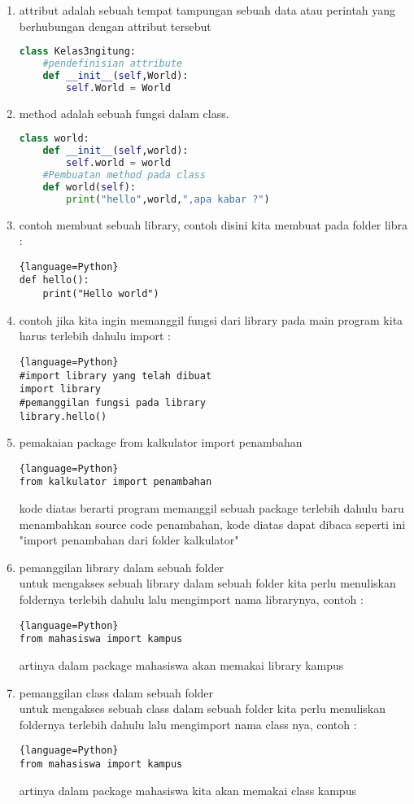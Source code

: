 \begin{enumerate}
			\item attribut adalah sebuah tempat tampungan sebuah data atau perintah yang berhubungan dengan attribut tersebut
			\begin{lstlisting}[language=Python]
class Kelas3ngitung:
	#pendefinisian attribute
    def __init__(self,World):
        self.World = World
			\end{lstlisting}
			
			\item method adalah sebuah fungsi dalam class.
			\begin{lstlisting}[language=Python]
class world:
    def __init__(self,world):
        self.world = world
    #Pembuatan method pada class
    def world(self):
       	print("hello",world,",apa kabar ?")
			\end{lstlisting}
			
			\item contoh membuat sebuah library, contoh disini kita membuat pada folder libra :
			\begin{lstlisting}{language=Python}
def hello():
    print("Hello world")
			\end{lstlisting}

            \newpage
			\item contoh jika kita ingin memanggil fungsi dari library pada main program kita harus terlebih dahulu import :
			\begin{lstlisting}{language=Python}
#import library yang telah dibuat
import library
#pemanggilan fungsi pada library
library.hello()
			\end{lstlisting}
			
			\item pemakaian package from kalkulator import penambahan
			\begin{lstlisting}{language=Python}
from kalkulator import penambahan
			\end{lstlisting}
kode diatas berarti program memanggil sebuah package terlebih dahulu baru menambahkan source code penambahan, kode diatas dapat dibaca seperti ini "import penambahan dari folder kalkulator"

			\item pemanggilan library dalam sebuah folder\\
			untuk mengakses sebuah library dalam sebuah folder kita perlu menuliskan foldernya terlebih dahulu lalu mengimport nama librarynya, contoh :
			\begin{lstlisting}{language=Python}
from mahasiswa import kampus
			\end{lstlisting}
artinya dalam package mahasiswa akan memakai library kampus

			\item pemanggilan class dalam sebuah folder\\
			untuk mengakses sebuah class dalam sebuah folder kita perlu menuliskan foldernya terlebih dahulu lalu mengimport nama class nya, contoh :
			\begin{lstlisting}{language=Python}
from mahasiswa import kampus
			\end{lstlisting}
artinya dalam package mahasiswa kita akan memakai class kampus
			
			\end{enumerate}

